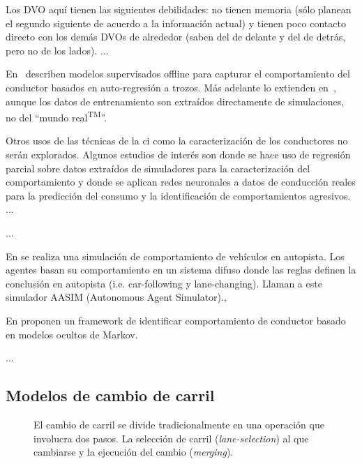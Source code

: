 Los DVO aquí tienen las siguientes debilidades: no tienen memoria (sólo planean el segundo siguiente de acuerdo a la información actual) y tienen poco contacto directo con los demás DVOs de alrededor (saben del de delante y del de detrás, pero no de los lados).
...




En~\cite{sekizawa2007modeling} describen modelos supervisados offline para capturar el comportamiento del conductor basados en auto-regresión a trozos. Más adelante lo extienden en~\cite{terada2010multi}, aunque los datos de entrenamiento son extraídos directamente de simulaciones, no del \enquote{mundo real\textsuperscript{TM}}.

Otros usos de las técnicas de la \gls{ci} como la caracterización de los conductores no serán explorados. Algunos estudios de interés son \cite{sekizawa2007modeling, terada2010multi} donde se hace uso de regresión parcial sobre datos extraídos de simuladores para la caracterización del comportamiento y \cite{DiazAlvarez2014} donde se aplican redes neuronales a datos de conducción reales para la predicción del consumo y la identificación de comportamientos agresivos.
...


...

En \cite{Das} se realiza una simulación de comportamiento de vehículos en autopista. Los agentes basan su comportamiento en un sistema difuso donde las reglas definen la conclusión en autopista (i.e. car-following y lane-changing). Llaman a este simulador AASIM (Autonomous Agent Simulator).,




En \cite{Kuge2000} proponen un framework de identificar comportamiento de conductor basado en modelos ocultos de Markov.

...







\subsection{Modelos de cambio de carril}

\begin{figure}
	\caption{El cambio de carril se divide tradicionalmente en una operación que involucra dos pasos. La selección de carril (\textit{lane-selection}) al que cambiarse y la ejecución del cambio (\textit{merging}).}
	\label{fig:lane-selection-plus-merging}
\end{figure}


